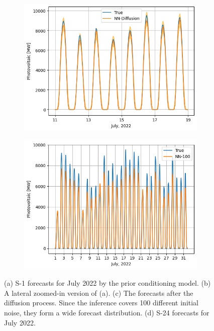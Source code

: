 \documentclass{article}
\begin{document}
\begin{figure}[t]
\begin{subfigure}{.45\textwidth}
    \includegraphics[width=1\linewidth]{solar-1-zoom-diff.png}
    \caption{}
    \label{fig:solar-1-zoom-diff}
  \end{subfigure}%
  \begin{subfigure}{.45\textwidth}
    \centering
    \includegraphics[width=1\linewidth]{solar-24.png}
    \caption{}
    \label{fig:solar-24}
  \end{subfigure}
  \caption{(a) S-1 forecasts for July 2022 by the prior conditioning model. (b) A lateral zoomed-in version of (a). (c) The forecasts after the diffusion process. Since the inference covers 100 different initial noise, they form a wide forecast distribution. (d) S-24 forecasts for July 2022.}
  \label{fig:solar}
\end{figure}
\end{document}
